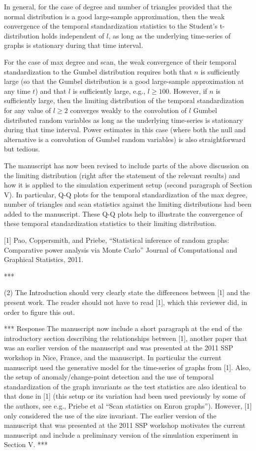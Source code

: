 In general, for the case of degree and number of triangles provided
that the normal distribution is a good large-sample approximation,
then the weak convergence of the temporal standardization statistics
to the Student's t-distribution holds independent of $l$, as long as
the underlying time-series of graphs is stationary during that time
interval.

For the case of max degree and scan, the weak convergence of
their temporal standardization to the Gumbel distribution requires
both that $n$ is sufficiently large (so that the Gumbel distribution
is a good large-sample approximation at any time $t$) and that $l$ is
sufficiently large, e.g., $l \geq 100$. However, if $n$ is
sufficiently large, then the limiting distribution of the temporal
standardization for any value of $l \geq 2$ converges weakly to the
convolution of $l$ Gumbel distributed random variables as long as the
underlying time-series is stationary during that time interval. Power
estimates in this case (where both the null and alternative is a
convolution of Gumbel random variables) is also straightforward but tedious. 

The manuscript has now been revised to include parts of the above
discussion on the limiting distribution (right after the statement of
the relevant results) and how it is applied to the simulation
experiment setup (second paragraph of Section V). In particular, Q-Q
plots for the temporal standardization of the max degree, number of
triangles and scan statistics against the limiting distributions had
been added to the manuscript. These Q-Q plots help to illustrate the
convergence of these temporal standardization statistics to their
limiting distribution.

[1] Pao, Coppersmith, and Priebe, ``Statistical inference of random graphs: Comparative
power analysis via Monte Carlo'' Journal of Computational and Graphical Statistics, 2011. 

***

(2) The Introduction should very clearly state the differences between [1]
and the present work. The reader should not have to read [1], which
this reviewer did, in order to figure this out.

*** Response
The manuscript now include a short paragraph at the end of the introductory
section describing the relationships between [1], another paper that
was an earlier version of the manuscript and was presented at the 2011
SSP workshop in Nice, France, and the manuscript. In particular the
current manuscript used the generative model for the time-series of graphs
from [1]. Also, the setup of anomaly/change-point detection and the
use of temporal standardization of the graph invariants as the test
statistics are also identical to that done in [1] (this setup or
its variation had been used previously by some of the authors, see
e.g., Priebe et al ``Scan statistics on Enron graphs''). However, [1] only
considered the use of the size invariant. The earlier version of the
manuscript that was presented at the 2011 SSP workshop motivates the
current manuscript and include a preliminary version of the simulation
experiment in Section V.  
***

